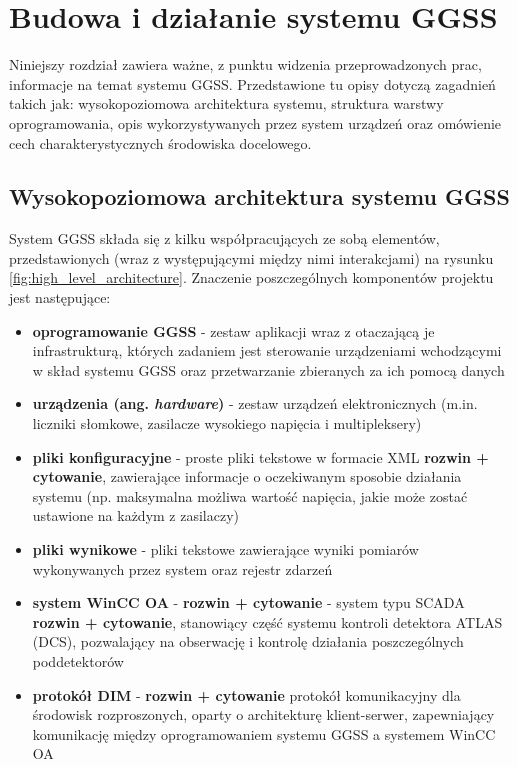 \chapter{Budowa i działanie systemu GGSS}
\label{cha:ggss}

Niniejszy rozdział zawiera ważne, z punktu widzenia przeprowadzonych prac, informacje na temat systemu GGSS. Przedstawione tu opisy dotyczą zagadnień takich jak: wysokopoziomowa architektura systemu, struktura warstwy oprogramowania, opis wykorzystywanych przez system urządzeń oraz omówienie cech charakterystycznych środowiska docelowego. 


\section{Wysokopoziomowa architektura systemu GGSS}
System GGSS składa się z kilku współpracujących ze sobą elementów, przedstawionych (wraz z występującymi między nimi interakcjami) na rysunku \ref{fig:high_level_architecture}. Znaczenie poszczególnych komponentów projektu jest następujące:
\begin{itemize}
    \item \textbf{oprogramowanie GGSS} - zestaw aplikacji wraz z otaczającą je infrastrukturą, których zadaniem jest sterowanie urządzeniami wchodzącymi w skład systemu GGSS oraz przetwarzanie zbieranych za ich pomocą danych
    \item \textbf{urządzenia (ang. \textit{hardware})} - zestaw urządzeń elektronicznych (m.in. liczniki słomkowe, zasilacze wysokiego napięcia i multipleksery)
    \item \textbf{pliki konfiguracyjne} - proste pliki tekstowe w formacie XML \textbf{rozwin + cytowanie}, zawierające informacje o oczekiwanym sposobie działania systemu (np. maksymalna możliwa wartość napięcia, jakie może zostać ustawione na każdym z zasilaczy)
    \item \textbf{pliki wynikowe} - pliki tekstowe zawierające wyniki pomiarów wykonywanych przez system oraz rejestr zdarzeń 
    \item \textbf{system WinCC OA} - \textbf{rozwin + cytowanie} - system typu SCADA \textbf{rozwin + cytowanie}, stanowiący część systemu kontroli detektora ATLAS (DCS), pozwalający na obserwację i kontrolę działania poszczególnych poddetektorów
    \item \textbf{protokół DIM} - \textbf{rozwin + cytowanie} protokół komunikacyjny dla środowisk rozproszonych, oparty o architekturę klient-serwer, zapewniający komunikację między oprogramowaniem systemu GGSS a systemem WinCC OA
\end{itemize}

